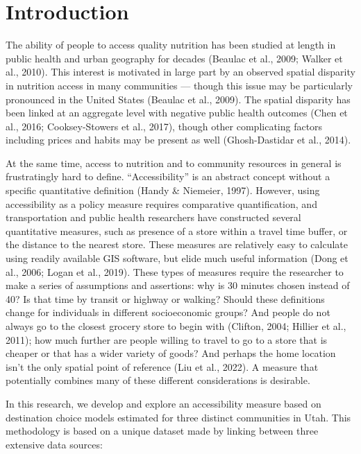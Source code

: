 \documentclass[
  letterpaper,
  number,
  review,
  doubleblind,
  3p]{elsarticle}
\begin{document}

\section{Introduction}\label{introduction}

The ability of people to access quality nutrition has been studied at
length in public health and urban geography for decades (Beaulac et al.,
2009; Walker et al., 2010). This interest is motivated in large part by
an observed spatial disparity in nutrition access in many communities
--- though this issue may be particularly pronounced in the United
States (Beaulac et al., 2009). The spatial disparity has been linked at
an aggregate level with negative public health outcomes (Chen et al.,
2016; Cooksey-Stowers et al., 2017), though other complicating factors
including prices and habits may be present as well (Ghosh-Dastidar et
al., 2014).

At the same time, access to nutrition and to community resources in
general is frustratingly hard to define. ``Accessibility'' is an
abstract concept without a specific quantitative definition (Handy \&
Niemeier, 1997). However, using accessibility as a policy measure
requires comparative quantification, and transportation and public
health researchers have constructed several quantitative measures, such
as presence of a store within a travel time buffer, or the distance to
the nearest store. These measures are relatively easy to calculate using
readily available GIS software, but elide much useful information (Dong
et al., 2006; Logan et al., 2019). These types of measures require the
researcher to make a series of assumptions and assertions: why is 30
minutes chosen instead of 40? Is that time by transit or highway or
walking? Should these definitions change for individuals in different
socioeconomic groups? And people do not always go to the closest grocery
store to begin with (Clifton, 2004; Hillier et al., 2011); how much
further are people willing to travel to go to a store that is cheaper or
that has a wider variety of goods? And perhaps the home location isn't
the only spatial point of reference (Liu et al., 2022). A measure that
potentially combines many of these different considerations is
desirable.

In this research, we develop and explore an accessibility measure based
on destination choice models estimated for three distinct communities in
Utah. This methodology is based on a unique dataset made by linking
between three extensive data sources:
\end{document}
